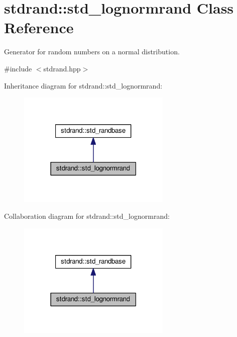 \hypertarget{classstdrand_1_1std__lognormrand}{}\section{stdrand\+:\+:std\+\_\+lognormrand Class Reference}
\label{classstdrand_1_1std__lognormrand}


Generator for random numbers on a normal distribution.  




{\ttfamily \#include $<$stdrand.\+hpp$>$}



Inheritance diagram for stdrand\+:\+:std\+\_\+lognormrand\+:
\nopagebreak
\begin{figure}[H]
\begin{center}
\leavevmode
\includegraphics[width=207pt]{d2/deb/classstdrand_1_1std__lognormrand__inherit__graph}
\end{center}
\end{figure}


Collaboration diagram for stdrand\+:\+:std\+\_\+lognormrand\+:
\nopagebreak
\begin{figure}[H]
\begin{center}
\leavevmode
\includegraphics[width=207pt]{d1/d02/classstdrand_1_1std__lognormrand__coll__graph}
\end{center}
\end{figure}
